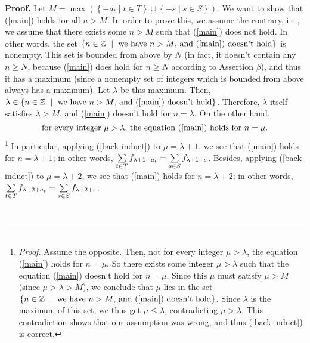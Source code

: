 \documentclass[numbers=enddot,12pt,final,onecolumn,notitlepage]{scrartcl}%
\numberwithin{exer}{section}
\theoremstyle{definition}
\newenvironment{proof}[1][Proof]{\noindent\textbf{#1.} }{\ \rule{0.5em}{0.5em}}
\let\sumnonlimits\sum
\renewcommand{\sum}{\sumnonlimits\limits}
\begin{document}
\begin{proof}
Let $M=\max\left(  \left\{  -a_{t}\mid t\in T\right\}  \cup\left\{  -s\mid
s\in S\right\}  \right)  $. We want to show that (\ref{main}) holds for all
$n>M$. In order to prove this, we assume the contrary, i.e., we assume that
there exists some $n>M$ such that (\ref{main}) does not hold. In other words,
the set $\left\{  n\in\mathbb{Z}\ \mid\ \text{we have }n>M\text{, and
(\ref{main}) doesn't hold}\right\}  $ is nonempty. This set is bounded from
above by $N$ (in fact, it doesn't contain any $n\geq N$, because (\ref{main})
does hold for $n\geq N$ according to Assertion $\beta$), and thus it has a
maximum (since a nonempty set of integers which is bounded from above always
has a maximum). Let $\lambda$ be this maximum. Then, $\lambda\in\left\{
n\in\mathbb{Z}\ \mid\ \text{we have }n>M\text{, and (\ref{main}) doesn't
hold}\right\}  $. Therefore, $\lambda$ itself satisfies $\lambda>M$, and
(\ref{main}) doesn't hold for $n=\lambda$. On the other hand,%
\begin{equation}
\text{for every integer }\mu>\lambda\text{, the equation (\ref{main}) holds
for }n=\mu. \label{back-induct}%
\end{equation}
\footnote{\textit{Proof.} Assume the opposite. Then, not for every integer
$\mu>\lambda$, the equation (\ref{main}) holds for $n=\mu$. So there exists
some integer $\mu>\lambda$ such that the equation (\ref{main}) doesn't hold
for $n=\mu$. Since this $\mu$ must satisfy $\mu>M$ (since $\mu>\lambda>M$), we
conclude that $\mu$ lies in the set $\left\{  n\in\mathbb{Z}\ \mid\ \text{we
have }n>M\text{, and (\ref{main}) doesn't hold}\right\}  $. Since $\lambda$ is
the maximum of this set, we thus get $\mu\leq\lambda$, contradicting
$\mu>\lambda$. This contradiction shows that our assumption was wrong, and
thus (\ref{back-induct}) is correct.} In particular, applying
(\ref{back-induct}) to $\mu=\lambda+1$, we see that (\ref{main}) holds for
$n=\lambda+1$; in other words, $\sum\limits_{t\in T}f_{\lambda+1+a_{t}}%
=\sum\limits_{s\in S}f_{\lambda+1+s}$. Besides, applying (\ref{back-induct})
to $\mu=\lambda+2$, we see that (\ref{main}) holds for $n=\lambda+2$; in other
words, $\sum\limits_{t\in T}f_{\lambda+2+a_{t}}=\sum\limits_{s\in S}%
f_{\lambda+2+s}$.


\end{proof}
\end{document}
